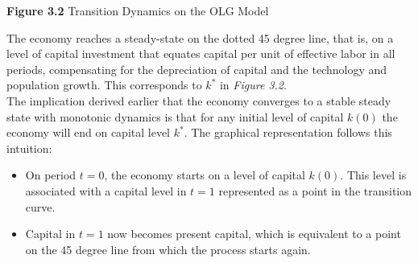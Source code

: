 \begin{center}
\textbf{Figure 3.2} Transition Dynamics on the OLG Model\\

\end{center}

The economy reaches a steady-state on the dotted 45 degree line, that is, on a level of capital investment that equates capital per unit of effective labor in all periods, compensating for the depreciation of capital and the technology and population growth. This corresponds to $k^*$ in \textit{Figure 3.2}.\\

The implication derived earlier that the economy converges to a stable steady state with monotonic dynamics is that for any initial level of capital $k(0)$ the economy will end on capital level $k^*$. The graphical representation follows this intuition:
\begin{itemize}
\item On period $t=0$, the economy starts on a level of capital $k(0)$. This level is associated with a capital level in $t=1$ represented as a point in the transition curve. 
\item Capital in $t=1$ now becomes present capital, which is equivalent to a point on the 45 degree line from which the process starts again. 
\end{itemize}

